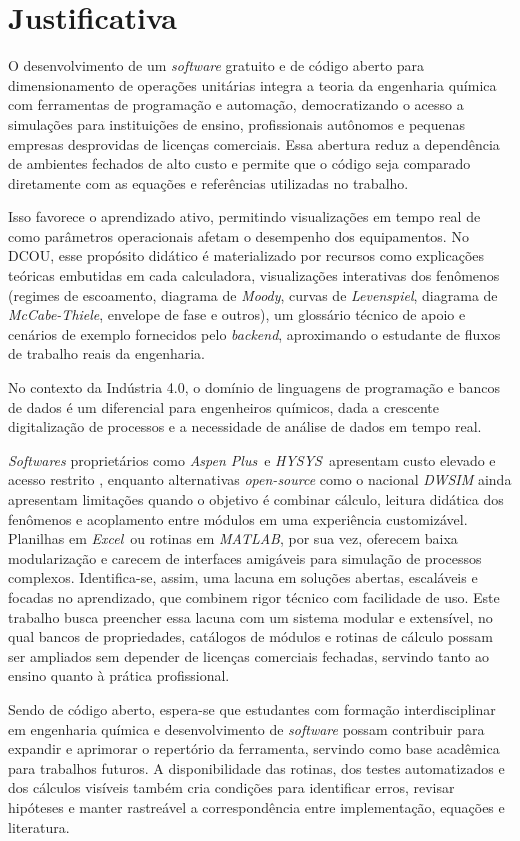 \chapter{Justificativa}

O desenvolvimento de um \textit{software} gratuito e de código aberto para dimensionamento de operações unitárias integra a teoria da engenharia química com ferramentas de programação e automação, democratizando o acesso a simulações para instituições de ensino, profissionais autônomos e pequenas empresas desprovidas de licenças comerciais. Essa abertura reduz a dependência de ambientes fechados de alto custo e permite que o código seja comparado diretamente com as equações e referências utilizadas no trabalho.

Isso favorece o aprendizado ativo, permitindo visualizações em tempo real de como parâmetros operacionais afetam o desempenho dos equipamentos. No DCOU, esse propósito didático é materializado por recursos como explicações teóricas embutidas em cada calculadora, visualizações interativas dos fenômenos (regimes de escoamento, diagrama de \textit{Moody}, curvas de \textit{Levenspiel}, diagrama de \textit{McCabe-Thiele}, envelope de fase e outros), um glossário técnico de apoio e cenários de exemplo fornecidos pelo \textit{backend}, aproximando o estudante de fluxos de trabalho reais da engenharia.

No contexto da Indústria 4.0, o domínio de linguagens de programação e bancos de dados é um diferencial para engenheiros químicos, dada a crescente digitalização de processos e a necessidade de análise de dados em tempo real.

\textit{Softwares} proprietários como \textit{Aspen Plus}\textregistered\ e \textit{HYSYS}\textregistered\ apresentam custo elevado e acesso restrito \cite{aspen2025,aspenhysys2026,alves2022}, enquanto alternativas \textit{open-source} como o nacional \textit{DWSIM} \cite{dwsim2025} ainda apresentam limitações quando o objetivo é combinar cálculo, leitura didática dos fenômenos e acoplamento entre módulos em uma experiência customizável. Planilhas em \textit{Excel}\textregistered\ ou rotinas em \textit{MATLAB}\textregistered, por sua vez, oferecem baixa modularização e carecem de interfaces amigáveis para simulação de processos complexos. Identifica-se, assim, uma lacuna em soluções abertas, escaláveis e focadas no aprendizado, que combinem rigor técnico com facilidade de uso. Este trabalho busca preencher essa lacuna com um sistema modular e extensível, no qual bancos de propriedades, catálogos de módulos e rotinas de cálculo possam ser ampliados sem depender de licenças comerciais fechadas, servindo tanto ao ensino quanto à prática profissional.

Sendo de código aberto, espera-se que estudantes com formação interdisciplinar em engenharia química e desenvolvimento de \textit{software} possam contribuir para expandir e aprimorar o repertório da ferramenta, servindo como base acadêmica para trabalhos futuros. A disponibilidade das rotinas, dos testes automatizados e dos cálculos visíveis também cria condições para identificar erros, revisar hipóteses e manter rastreável a correspondência entre implementação, equações e literatura.
